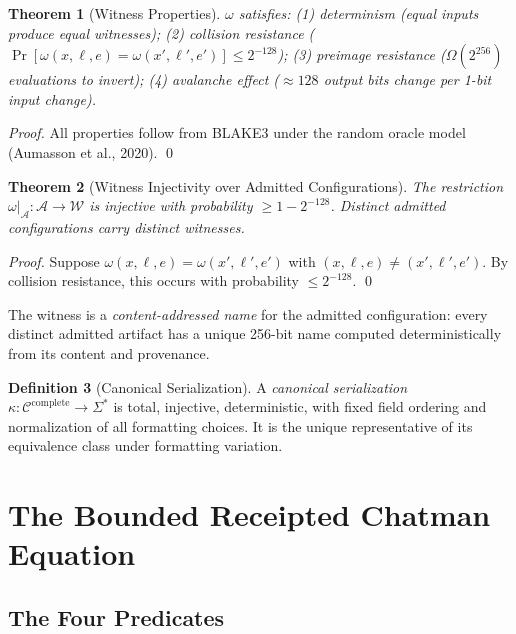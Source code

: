 \documentclass[12pt, letterpaper]{report}
\theoremstyle{plain}
\newtheorem{theorem}{Theorem}[chapter]
\theoremstyle{definition}
\newtheorem{definition}[theorem]{Definition}
\theoremstyle{remark}
\newcommand{\CC}{\mathcal{C}}
\newcommand{\W}{\mathcal{W}}
\begin{document}
\begin{theorem}[Witness Properties]
\label{thm:witness}
$\omega$ satisfies:
(1) determinism (equal inputs produce equal witnesses);
(2) collision resistance ($\Pr[\omega(x,\ell,e) = \omega(x',\ell',e')] \leq 2^{-128}$);
(3) preimage resistance ($\Omega(2^{256})$ evaluations to invert);
(4) avalanche effect ($\approx 128$ output bits change per 1-bit input change).
\end{theorem}

\begin{proof}
All properties follow from BLAKE3 under the random oracle model
(Aumasson et al., 2020). \qed
\end{proof}

\begin{theorem}[Witness Injectivity over Admitted Configurations]
\label{thm:injectivity}
The restriction $\omega|_\mathcal{A} : \mathcal{A} \to \W$ is injective
with probability $\geq 1 - 2^{-128}$.
Distinct admitted configurations carry distinct witnesses.
\end{theorem}

\begin{proof}
Suppose $\omega(x,\ell,e) = \omega(x',\ell',e')$ with
$(x,\ell,e) \neq (x',\ell',e')$.
By collision resistance, this occurs with probability $\leq 2^{-128}$. \qed
\end{proof}

The witness is a \emph{content-addressed name} for the admitted configuration:
every distinct admitted artifact has a unique 256-bit name computed
deterministically from its content and provenance.

\begin{definition}[Canonical Serialization]
A \emph{canonical serialization} $\kappa : \CC^{\mathrm{complete}} \to \Sigma^*$
is total, injective, deterministic, with fixed field ordering and normalization
of all formatting choices. It is the unique representative of its equivalence
class under formatting variation.
\end{definition}

\chapter{The Bounded Receipted Chatman Equation}
\label{ch:brce}

\section{The Four Predicates}
\end{document}
